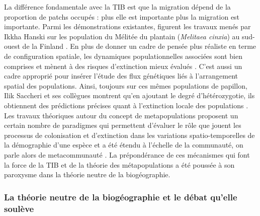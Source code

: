 La différence fondamentale avec la TIB est que la migration dépend de la
proportion de patchs occupés : plus elle est importante plus la
migration est importante. Parmi les démonstrations existantes, figurent
les travaux menés par Ikkha Hanski sur les population du Mélitée du
plantain (\emph{Melitaea cinxia}) au sud-ouest de la Finland
\citep{Hanski1998}. En plus de donner un cadre de pensée plus réaliste
en terme de configuration spatiale, les dynamiques populationnelles
associées sont bien comprises et mènent à des risques d'extinction mieux
évalués \citep{Hanski1998}. C'est aussi un cadre approprié pour insérer
l'étude des flux génétiques liés à l'arrangement spatial des
populations. Ainsi, toujours sur ces mêmes populations de papillon, Ilik
Saccheri et ses collègues montrent qu'en ajoutant le degré
d'hétérozygotie, ils obtiennent des prédictions précises quant à
l'extinction locale des populations \citep{Saccheri1998}. Les travaux
théoriques autour du concept de metapopulations proposent un certain
nombre de paradigmes qui permettent d'évaluer le rôle que jouent les
processus de colonisation et d'extinction dans les variations
spatio-temporelles de la démographie d'une espèce et a été étendu à
l'échelle de la communauté, on parle alors de metacommunauté
\citep{Leibold2004, Holyoak2005}. La prépondérance de ces mécanismes qui
font la force de la TIB et de la théorie des métapopulations a été
poussée à son paroxysme dans la théorie neutre de la biogéographie.

\subsubsection*{La théorie neutre de la biogéographie et le débat
qu'elle
soulève}\label{la-thuxe9orie-neutre-de-la-bioguxe9ographie-et-le-duxe9bat-quelle-souluxe8ve}

